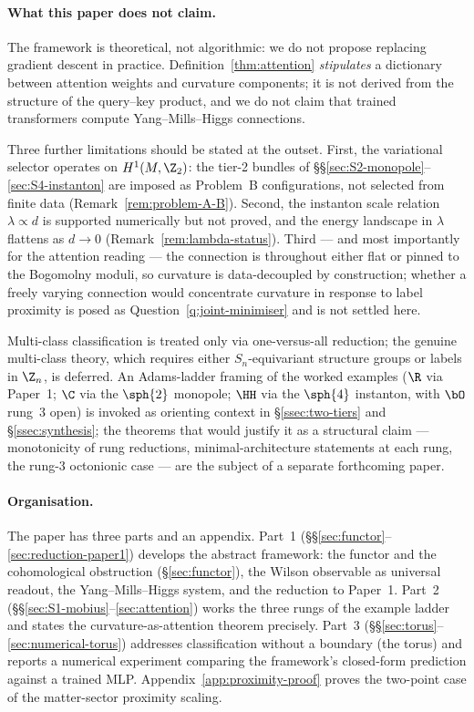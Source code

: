 \paragraph{What this paper does not claim.} The framework is
theoretical, not algorithmic: we do not propose replacing gradient
descent in practice. Definition~\ref{thm:attention} \emph{stipulates}
a dictionary between attention weights and curvature components; it
is not derived from the structure of the query--key product, and we
do not claim that trained transformers compute Yang--Mills--Higgs
connections.

Three further limitations should be stated at the outset. First, the
variational selector operates on $H^1(M,\Z_2)$: the tier-2 bundles
of \S\S\ref{sec:S2-monopole}--\ref{sec:S4-instanton} are imposed as
Problem~B configurations, not selected from finite data
(Remark~\ref{rem:problem-A-B}). Second, the instanton scale relation
$\lambda\propto d$ is supported numerically but not proved, and the
energy landscape in $\lambda$ flattens as $d\to 0$
(Remark~\ref{rem:lambda-status}). Third --- and most importantly for
the attention reading --- the connection is throughout either flat
or pinned to the Bogomolny moduli, so curvature is data-decoupled by
construction; whether a freely varying connection would concentrate
curvature in response to label proximity is posed as
Question~\ref{q:joint-minimiser} and is not settled here.

Multi-class classification is treated only via
one-versus-all reduction; the genuine multi-class theory, which
requires either $S_n$-equivariant structure groups or labels in
$\Z_n$, is deferred. An Adams-ladder framing of the worked examples
($\R$ via Paper~1; $\C$ via the $\sph{2}$ monopole; $\HH$ via the
$\sph{4}$ instanton, with $\bO$ rung~3 open) is invoked as orienting
context in \S\ref{ssec:two-tiers} and \S\ref{ssec:synthesis};
the theorems that would justify it as a structural claim ---
monotonicity of rung reductions, minimal-architecture statements at
each rung, the rung-3 octonionic case --- are the subject of a
separate forthcoming paper.

\paragraph{Organisation.} The paper has three parts and an
appendix. Part~1
(\S\S\ref{sec:functor}--\ref{sec:reduction-paper1}) develops the
abstract framework: the functor and the cohomological obstruction
(\S\ref{sec:functor}), the Wilson observable as universal readout,
the Yang--Mills--Higgs system, and the reduction to Paper~1. Part~2
(\S\S\ref{sec:S1-mobius}--\ref{sec:attention}) works the three rungs
of the example ladder and states the curvature-as-attention theorem
precisely. Part~3 (\S\S\ref{sec:torus}--\ref{sec:numerical-torus})
addresses classification without a boundary (the torus) and reports
a numerical experiment comparing the framework's closed-form
prediction against a trained MLP.
Appendix~\ref{app:proximity-proof} proves the two-point case of the
matter-sector proximity scaling.

